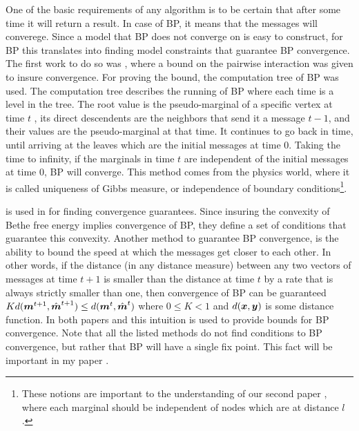 One of the basic requirements of any algorithm is to be certain that after some time it will return a result.
In case of BP, it means that the messages will converege.
Since a model that BP does not converge on is easy to construct, for BP this translates into finding model constraints that guarantee BP convergence. 
The first work to do so was \cite{tatikonda2002loopy}, where a bound on the pairwise interaction was given to insure convergence.
For proving the bound, the computation tree of BP was used.
The computation tree describes the running of BP where each time is a level in the tree.
The root value is the pseudo-marginal of a specific vertex at time $t$ , its direct descendents are the neighbors that send it a message $t-1$, and their values are the pseudo-marginal at that time.
It continues to go back in time, until arriving at the leaves which are the initial messages at time $0$.
Taking the time to infinity, if the marginals in time $t$ are independent of the initial messages at time $0$, BP will converge.
This method comes from the physics world, where it is called uniqueness of Gibbs measure, or independence of boundary conditions\footnote{These notions are important to the understanding of our second paper \cite{heinemann2014inferning}, where each marginal should be independent of nodes which are at distance $l$.}.

 is used in \cite{heskes2004uniqueness} for finding convergence guarantees.
Since insuring the convexity of Bethe free energy implies convergence of BP, they define a set of conditions that guarantee this convexity.
Another method to guarantee BP convergence, is the ability to bound the speed at which the messages get closer to each other.
In other words, if the distance (in any distance measure) between any two vectors of messages at time $t+1$ is smaller than the distance at time $t$ by a rate that is always strictly smaller than one, then convergence of BP can be guaranteed $ K d(\boldsymbol{m}^{t+1}, \hat{\boldsymbol{m}}^{t+1}) \leq d(\boldsymbol{m}^t, \hat{\boldsymbol{m}}^t)$ where $0\leq K<1$ and $d(\boldsymbol{x},\boldsymbol{y})$ is some distance function.
In both papers \cite{mooij2007sufficient} and \cite{roosta2008convergence} this intuition is used to provide bounds for BP convergence.
Note that all the listed methods do not find conditions to BP convergence, but rather that BP will have a single fix point.
This fact will be important in my paper \cite{heinemann2012cannot}.

